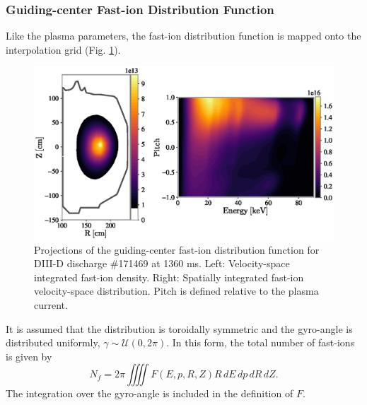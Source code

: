 \subsubsection{Guiding-center Fast-ion Distribution Function}
Like the plasma parameters, the fast-ion distribution function is mapped onto the interpolation grid (Fig. \ref{fig:fast_ion_distribution}). 
\begin{figure}
    \centering
    \includegraphics[width=13cm]{figures/fast_ion_distribution.eps}
    \caption{Projections of the guiding-center fast-ion distribution function for DIII-D discharge \#171469 at 1360 ms. Left: Velocity-space integrated fast-ion density. Right: Spatially integrated fast-ion velocity-space distribution. Pitch is defined relative to the plasma current.}
    \label{fig:fast_ion_distribution}
\end{figure}
It is assumed that the distribution is toroidally symmetric and the gyro-angle is distributed uniformly, $\gamma \sim \mathcal{U}(0,2\pi)$.
In this form, the total number of fast-ions is given by
\begin{equation}\label{eq:f_ntot}
    N_{f} = 2\pi \iiiint F(E,p,R,Z) R\,dE\,dp\,dR\,dZ.
\end{equation}
The integration over the gyro-angle is included in the definition of $F$.

